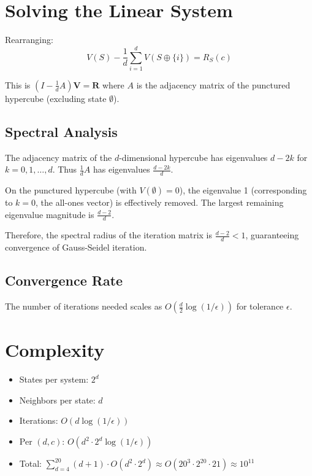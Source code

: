 \documentclass[11pt]{article}
\begin{document}
\section{Solving the Linear System}

Rearranging:
\[
V(S) - \frac{1}{d}\sum_{i=1}^{d} V(S \oplus \{i\}) = R_S(c)
\]

This is $(I - \frac{1}{d}A) \mathbf{V} = \mathbf{R}$ where $A$ is the adjacency matrix of the punctured hypercube (excluding state $\emptyset$).

\subsection{Spectral Analysis}

The adjacency matrix of the $d$-dimensional hypercube has eigenvalues $d - 2k$ for $k = 0, 1, \ldots, d$. Thus $\frac{1}{d}A$ has eigenvalues $\frac{d-2k}{d}$.

On the punctured hypercube (with $V(\emptyset) = 0$), the eigenvalue 1 (corresponding to $k=0$, the all-ones vector) is effectively removed. The largest remaining eigenvalue magnitude is $\frac{d-2}{d}$.

Therefore, the spectral radius of the iteration matrix is $\frac{d-2}{d} < 1$, guaranteeing convergence of Gauss-Seidel iteration.

\subsection{Convergence Rate}

The number of iterations needed scales as $O\!\left(\frac{d}{2} \log(1/\epsilon)\right)$ for tolerance $\epsilon$.

\section{Complexity}

\begin{itemize}
\item States per system: $2^d$
\item Neighbors per state: $d$
\item Iterations: $O(d \log(1/\epsilon))$
\item Per $(d, c)$: $O(d^2 \cdot 2^d \log(1/\epsilon))$
\item Total: $\sum_{d=4}^{20} (d+1) \cdot O(d^2 \cdot 2^d) \approx O(20^3 \cdot 2^{20} \cdot 21) \approx 10^{11}$
\end{itemize}
\end{document}
